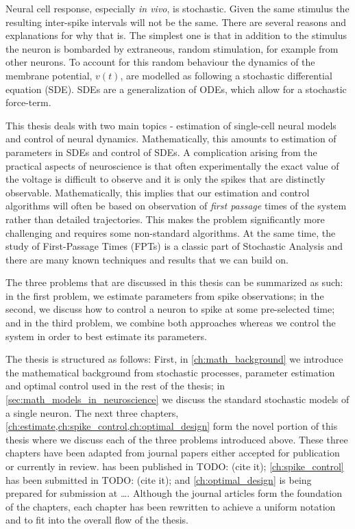 \documentclass{report}
\begin{document}
Neural cell response, especially {\sl in vivo}, is stochastic. Given the same
stimulus the resulting inter-spike intervals will not be the same. There are
several reasons and explanations for why that is. The simplest one is that in
addition to the stimulus the neuron is bombarded by extraneous, random
stimulation, for example from other neurons. To account for this random
behaviour the dynamics of the membrane potential, $v(t)$, are modelled as
following a stochastic differential equation (SDE). SDEs are a generalization
of ODEs, which allow for a stochastic force-term. 

This thesis deals with two main topics - estimation of single-cell neural models
and control of neural dynamics. Mathematically, this amounts to estimation of
parameters in SDEs and control of SDEs. A complication arising from the
practical aspects of neuroscience is that often experimentally the exact value
of the voltage is difficult to observe and it is only the spikes that are
distinctly observable. Mathematically, this implies that our estimation
and control algorithms will often be based on observation of {\sl first
passage} times of the system rather than detailed trajectories. This makes the problem
significantly more challenging and requires some non-standard
algorithms. At the same time, the study of First-Passage Times (FPTs) is a
classic part of Stochastic Analysis and there are many known
techniques and results that we can build on.

The three problems that are discussed in this thesis can be summarized as
such: in the first problem, we estimate parameters from spike observations; 
in the second, we discuss how to control a neuron to spike at some pre-selected
time; and in the third problem, we combine both approaches whereas we
control the system in order to best estimate its parameters.

The thesis is structured as follows: First, in \cref{ch:math_background} we
introduce the mathematical background from stochastic processes, parameter
estimation and optimal control used in the rest of the thesis; in
\cref{sec:math_models_in_neuroscience} we discuss the standard stochastic models
of a single neuron. The next three chapters,
\cref{ch:estimate,ch:spike_control,ch:optimal_design} form the novel portion of
this thesis where we discuss each of the three problems introduced above. These
three chapters have been adapted from journal papers either accepted for
publication or currently in review.  has been published in
TODO: (cite it); \cref{ch:spike_control} has been submitted in TODO: (cite it);
and \cref{ch:optimal_design} is being prepared for submission at \ldots.
Although the journal articles form the foundation of the chapters, each chapter
has been rewritten to achieve a uniform notation and to fit into the overall
flow of the thesis.
\end{document}

